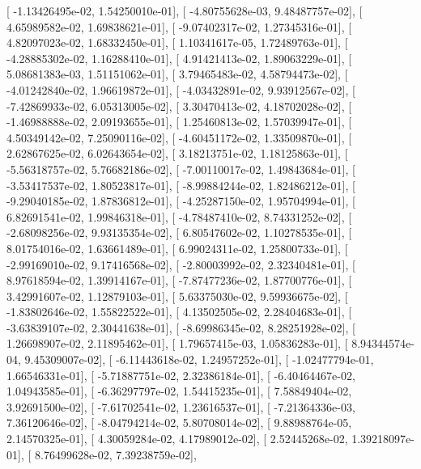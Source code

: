\documentclass{article}
\begin{document}
       [ -1.13426495e-02,   1.54250010e-01],
       [ -4.80755628e-03,   9.48487757e-02],
       [  4.65989582e-02,   1.69838621e-01],
       [ -9.07402317e-02,   1.27345316e-01],
       [  4.82097023e-02,   1.68332450e-01],
       [  1.10341617e-05,   1.72489763e-01],
       [ -4.28885302e-02,   1.16288410e-01],
       [  4.91421413e-02,   1.89063229e-01],
       [  5.08681383e-03,   1.51151062e-01],
       [  3.79465483e-02,   4.58794473e-02],
       [ -4.01242840e-02,   1.96619872e-01],
       [ -4.03432891e-02,   9.93912567e-02],
       [ -7.42869933e-02,   6.05313005e-02],
       [  3.30470413e-02,   4.18702028e-02],
       [ -1.46988888e-02,   2.09193655e-01],
       [  1.25460813e-02,   1.57039947e-01],
       [  4.50349142e-02,   7.25090116e-02],
       [ -4.60451172e-02,   1.33509870e-01],
       [  2.62867625e-02,   6.02643654e-02],
       [  3.18213751e-02,   1.18125863e-01],
       [ -5.56318757e-02,   5.76682186e-02],
       [ -7.00110017e-02,   1.49843684e-01],
       [ -3.53417537e-02,   1.80523817e-01],
       [ -8.99884244e-02,   1.82486212e-01],
       [ -9.29040185e-02,   1.87836812e-01],
       [ -4.25287150e-02,   1.95704994e-01],
       [  6.82691541e-02,   1.99846318e-01],
       [ -4.78487410e-02,   8.74331252e-02],
       [ -2.68098256e-02,   9.93135354e-02],
       [  6.80547602e-02,   1.10278535e-01],
       [  8.01754016e-02,   1.63661489e-01],
       [  6.99024311e-02,   1.25800733e-01],
       [ -2.99169010e-02,   9.17416568e-02],
       [ -2.80003992e-02,   2.32340481e-01],
       [  8.97618594e-02,   1.39914167e-01],
       [ -7.87477236e-02,   1.87700776e-01],
       [  3.42991607e-02,   1.12879103e-01],
       [  5.63375030e-02,   9.59936675e-02],
       [ -1.83802646e-02,   1.55822522e-01],
       [  4.13502505e-02,   2.28404683e-01],
       [ -3.63839107e-02,   2.30441638e-01],
       [ -8.69986345e-02,   8.28251928e-02],
       [  1.26698907e-02,   2.11895462e-01],
       [  1.79657415e-03,   1.05836283e-01],
       [  8.94344574e-04,   9.45309007e-02],
       [ -6.11443618e-02,   1.24957252e-01],
       [ -1.02477794e-01,   1.66546331e-01],
       [ -5.71887751e-02,   2.32386184e-01],
       [ -6.40464467e-02,   1.04943585e-01],
       [ -6.36297797e-02,   1.54415235e-01],
       [  7.58849404e-02,   3.92691500e-02],
       [ -7.61702541e-02,   1.23616537e-01],
       [ -7.21364336e-03,   7.36120646e-02],
       [ -8.04794214e-02,   5.80708014e-02],
       [  9.88988764e-05,   2.14570325e-01],
       [  4.30059284e-02,   4.17989012e-02],
       [  2.52445268e-02,   1.39218097e-01],
       [  8.76499628e-02,   7.39238759e-02],
\end{document}
